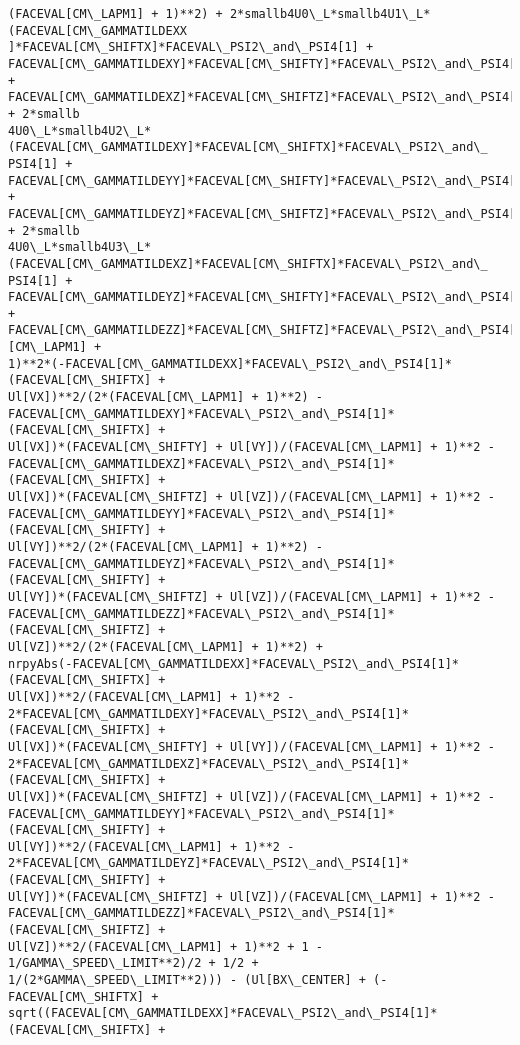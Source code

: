 \documentclass[landscape,letterpaper,10pt,english]{article}
\begin{document}
\begin{Verbatim}[commandchars=\\\{\}]
(FACEVAL[CM\_LAPM1] + 1)**2) + 2*smallb4U0\_L*smallb4U1\_L*(FACEVAL[CM\_GAMMATILDEXX
]*FACEVAL[CM\_SHIFTX]*FACEVAL\_PSI2\_and\_PSI4[1] +
FACEVAL[CM\_GAMMATILDEXY]*FACEVAL[CM\_SHIFTY]*FACEVAL\_PSI2\_and\_PSI4[1] +
FACEVAL[CM\_GAMMATILDEXZ]*FACEVAL[CM\_SHIFTZ]*FACEVAL\_PSI2\_and\_PSI4[1]) + 2*smallb
4U0\_L*smallb4U2\_L*(FACEVAL[CM\_GAMMATILDEXY]*FACEVAL[CM\_SHIFTX]*FACEVAL\_PSI2\_and\_
PSI4[1] + FACEVAL[CM\_GAMMATILDEYY]*FACEVAL[CM\_SHIFTY]*FACEVAL\_PSI2\_and\_PSI4[1] +
FACEVAL[CM\_GAMMATILDEYZ]*FACEVAL[CM\_SHIFTZ]*FACEVAL\_PSI2\_and\_PSI4[1]) + 2*smallb
4U0\_L*smallb4U3\_L*(FACEVAL[CM\_GAMMATILDEXZ]*FACEVAL[CM\_SHIFTX]*FACEVAL\_PSI2\_and\_
PSI4[1] + FACEVAL[CM\_GAMMATILDEYZ]*FACEVAL[CM\_SHIFTY]*FACEVAL\_PSI2\_and\_PSI4[1] +
FACEVAL[CM\_GAMMATILDEZZ]*FACEVAL[CM\_SHIFTZ]*FACEVAL\_PSI2\_and\_PSI4[1]))/((FACEVAL
[CM\_LAPM1] +
1)**2*(-FACEVAL[CM\_GAMMATILDEXX]*FACEVAL\_PSI2\_and\_PSI4[1]*(FACEVAL[CM\_SHIFTX] +
Ul[VX])**2/(2*(FACEVAL[CM\_LAPM1] + 1)**2) -
FACEVAL[CM\_GAMMATILDEXY]*FACEVAL\_PSI2\_and\_PSI4[1]*(FACEVAL[CM\_SHIFTX] +
Ul[VX])*(FACEVAL[CM\_SHIFTY] + Ul[VY])/(FACEVAL[CM\_LAPM1] + 1)**2 -
FACEVAL[CM\_GAMMATILDEXZ]*FACEVAL\_PSI2\_and\_PSI4[1]*(FACEVAL[CM\_SHIFTX] +
Ul[VX])*(FACEVAL[CM\_SHIFTZ] + Ul[VZ])/(FACEVAL[CM\_LAPM1] + 1)**2 -
FACEVAL[CM\_GAMMATILDEYY]*FACEVAL\_PSI2\_and\_PSI4[1]*(FACEVAL[CM\_SHIFTY] +
Ul[VY])**2/(2*(FACEVAL[CM\_LAPM1] + 1)**2) -
FACEVAL[CM\_GAMMATILDEYZ]*FACEVAL\_PSI2\_and\_PSI4[1]*(FACEVAL[CM\_SHIFTY] +
Ul[VY])*(FACEVAL[CM\_SHIFTZ] + Ul[VZ])/(FACEVAL[CM\_LAPM1] + 1)**2 -
FACEVAL[CM\_GAMMATILDEZZ]*FACEVAL\_PSI2\_and\_PSI4[1]*(FACEVAL[CM\_SHIFTZ] +
Ul[VZ])**2/(2*(FACEVAL[CM\_LAPM1] + 1)**2) +
nrpyAbs(-FACEVAL[CM\_GAMMATILDEXX]*FACEVAL\_PSI2\_and\_PSI4[1]*(FACEVAL[CM\_SHIFTX] +
Ul[VX])**2/(FACEVAL[CM\_LAPM1] + 1)**2 -
2*FACEVAL[CM\_GAMMATILDEXY]*FACEVAL\_PSI2\_and\_PSI4[1]*(FACEVAL[CM\_SHIFTX] +
Ul[VX])*(FACEVAL[CM\_SHIFTY] + Ul[VY])/(FACEVAL[CM\_LAPM1] + 1)**2 -
2*FACEVAL[CM\_GAMMATILDEXZ]*FACEVAL\_PSI2\_and\_PSI4[1]*(FACEVAL[CM\_SHIFTX] +
Ul[VX])*(FACEVAL[CM\_SHIFTZ] + Ul[VZ])/(FACEVAL[CM\_LAPM1] + 1)**2 -
FACEVAL[CM\_GAMMATILDEYY]*FACEVAL\_PSI2\_and\_PSI4[1]*(FACEVAL[CM\_SHIFTY] +
Ul[VY])**2/(FACEVAL[CM\_LAPM1] + 1)**2 -
2*FACEVAL[CM\_GAMMATILDEYZ]*FACEVAL\_PSI2\_and\_PSI4[1]*(FACEVAL[CM\_SHIFTY] +
Ul[VY])*(FACEVAL[CM\_SHIFTZ] + Ul[VZ])/(FACEVAL[CM\_LAPM1] + 1)**2 -
FACEVAL[CM\_GAMMATILDEZZ]*FACEVAL\_PSI2\_and\_PSI4[1]*(FACEVAL[CM\_SHIFTZ] +
Ul[VZ])**2/(FACEVAL[CM\_LAPM1] + 1)**2 + 1 - 1/GAMMA\_SPEED\_LIMIT**2)/2 + 1/2 +
1/(2*GAMMA\_SPEED\_LIMIT**2))) - (Ul[BX\_CENTER] + (-FACEVAL[CM\_SHIFTX] +
sqrt((FACEVAL[CM\_GAMMATILDEXX]*FACEVAL\_PSI2\_and\_PSI4[1]*(FACEVAL[CM\_SHIFTX] +

\end{Verbatim}
\end{document}

